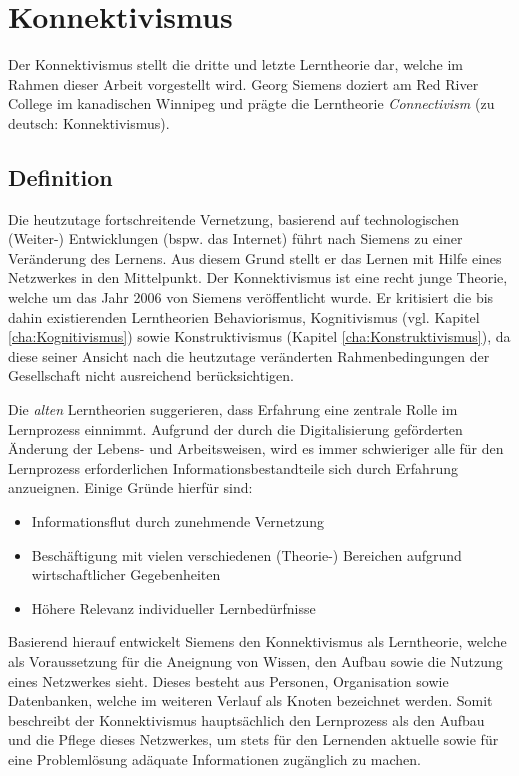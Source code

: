 \chapter{Konnektivismus}
\label{cha:Konnektivismus}
Der Konnektivismus stellt die dritte und letzte Lerntheorie dar, welche im Rahmen dieser Arbeit vorgestellt wird. Georg Siemens doziert am Red River College im kanadischen Winnipeg und prägte die Lerntheorie \emph{Connectivism} (zu deutsch: Konnektivismus).\cite[S. 159]{Erpenbeck.2007}

\section{Definition}\label{Konnektivismus Definition}
Die heutzutage fortschreitende Vernetzung, basierend auf technologischen (Weiter-) Entwicklungen (bspw. das Internet) führt nach Siemens zu einer Veränderung des Lernens. Aus diesem Grund stellt er das Lernen mit Hilfe eines Netzwerkes in den Mittelpunkt. Der Konnektivismus ist eine recht junge Theorie, welche um das Jahr 2006 von Siemens veröffentlicht wurde. Er kritisiert die bis dahin existierenden Lerntheorien Behaviorismus, Kognitivismus (vgl. Kapitel \ref{cha:Kognitivismus}) sowie Konstruktivismus (Kapitel \ref{cha:Konstruktivismus}), da diese seiner Ansicht nach die heutzutage veränderten Rahmenbedingungen der Gesellschaft nicht ausreichend berücksichtigen.\cite[S.47 f.]{Kuhlmann.2008} 


Die \emph{alten} Lerntheorien suggerieren, dass Erfahrung eine zentrale Rolle im Lernprozess einnimmt. Aufgrund der durch die Digitalisierung geförderten Änderung der Lebens- und Arbeitsweisen, wird es immer schwieriger alle für den Lernprozess erforderlichen Informationsbestandteile sich durch Erfahrung anzueignen.\cite[S. 159ff.]{Erpenbeck.2007} Einige Gründe hierfür sind:
\begin{itemize} 
	\item Informationsflut durch zunehmende Vernetzung %
	\item Beschäftigung mit vielen verschiedenen (Theorie-) Bereichen aufgrund wirtschaftlicher Gegebenheiten %
	\item Höhere Relevanz individueller Lernbedürfnisse %
\end{itemize}
Basierend hierauf entwickelt Siemens den Konnektivismus als Lerntheorie, welche als Voraussetzung für die Aneignung von Wissen, den Aufbau sowie die Nutzung eines Netzwerkes sieht. Dieses besteht aus Personen, Organisation sowie Datenbanken, welche im weiteren Verlauf als Knoten bezeichnet werden. Somit beschreibt der Konnektivismus hauptsächlich den Lernprozess als den Aufbau und die Pflege dieses Netzwerkes, um stets für den Lernenden aktuelle sowie für eine Problemlösung adäquate Informationen zugänglich zu machen.\cite[S. 47f.]{Kuhlmann.2008}

